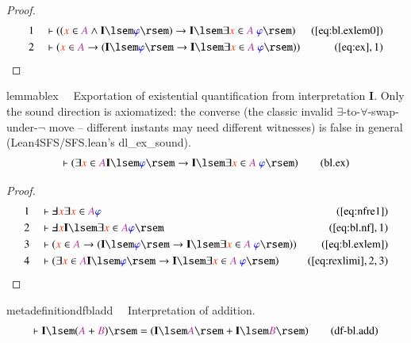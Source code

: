 \begin{proof}
\begin{align}
  1 &&  & \vdash ( ( \msc{x} \in \mc{A} \wedge \mathbf{I} \lsem
      \mw{\varphi} \rsem ) \rightarrow \mathbf{I} \lsem \exists \msc{x}
      \in \mc{A}~\mw{\varphi} \rsem )&(\mbox{\ref{eq:bl.exlem0}})\notag
  \\ 2 &&  & \vdash ( \msc{x} \in \mc{A} \rightarrow ( \mathbf{I} \lsem
      \mw{\varphi} \rsem \rightarrow \mathbf{I} \lsem \exists \msc{x}
      \in \mc{A}~\mw{\varphi} \rsem ) )&(\mbox{\ref{eq:ex}},1)\notag
\end{align}
\end{proof}

\begin{restatable}{lemma}{blex}~~ Exportation of existential quantification
from interpretation $\mathbf{I}$.  Only the sound direction is axiomatized:
the converse (the classic invalid $\exists$-to-$\forall$-swap-under-$\lnot$
move -- different instants may need different witnesses) is false in
general (Lean4SFS/SFS.lean's dl\_ex\_sound).
\begin{align}
\vdash ( \exists \msc{x} \in \mc{A} \mathbf{I} \lsem \mw{\varphi} \rsem
    \rightarrow \mathbf{I} \lsem \exists \msc{x} \in \mc{A}~\mw{\varphi} \rsem
    )\label{eq:bl.ex}\tag{bl.ex}
\end{align}
\end{restatable}

\begin{proof}
\begin{align}
  1 &&  & \vdash \Finv \msc{x} \exists \msc{x} \in \mc{A}
      \mw{\varphi}&(\mbox{\ref{eq:nfre1}})\notag
  \\ 2 &&  & \vdash \Finv \msc{x} \mathbf{I} \lsem \exists \msc{x} \in
      \mc{A} \mw{\varphi} \rsem&(\mbox{\ref{eq:bl.nf}},1)\notag
  \\ 3 &&  & \vdash ( \msc{x} \in \mc{A} \rightarrow ( \mathbf{I} \lsem
      \mw{\varphi} \rsem \rightarrow \mathbf{I} \lsem \exists \msc{x}
      \in \mc{A}~\mw{\varphi} \rsem )
      )&(\mbox{\ref{eq:bl.exlem}})\notag
  \\ 4 &&  & \vdash ( \exists \msc{x} \in \mc{A} \mathbf{I} \lsem
      \mw{\varphi} \rsem \rightarrow \mathbf{I} \lsem \exists \msc{x}
      \in \mc{A}~\mw{\varphi} \rsem
      )&(\mbox{\ref{eq:rexlimi}},2,3)\notag
\end{align}
\end{proof}

\begin{restatable}{metadefinition}{dfbladd}~~ Interpretation of addition.
\begin{align}
\vdash \mathbf{I} \lsem ( \mc{A} + \mc{B} ) \rsem = ( \mathbf{I} \lsem \mc{A}
    \rsem + \mathbf{I} \lsem \mc{B} \rsem )\label{eq:df-bl.add}\tag{df-bl.add}
\end{align}
\end{restatable}

